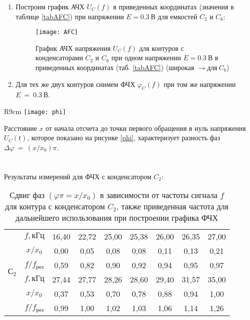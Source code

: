 \documentclass{lab}
\begin{document}
\begin{enumerate}
\newpage

\item
Построим график АЧХ $ U_C(f) $ в приведенных координатах (значения в таблице \ref{tabAFC})
при напряжении $ E = 0.3~В $ для емкостей $ C_2 $ и $ C_6 $:

\begin{figure}[H]
	\centering
	\texttt{[image: AFC]}
	\caption{\footnotesize
	График АЧХ напряжения $ U_C(f) $ для контуров с конденсаторами $ C_2 $ и $ C_6 $
	при одном напряжении $ E = 0.3~В $ в приведенных координатах (таб. \ref{tabAFC})
	(широкая $ \longrightarrow для \ C_6 $)
	}
	\label{AFC}
\end{figure}

\item
Для тех же двух контуров снимем ФЧХ $ \varphi_C(f) $ при том же напряжении $ E~=~0.3~В $.

\end{enumerate}

\begin{wrapfigure}[8]{R}{9cm}
	\vspace{-1.2cm}
	\texttt{[image: phi]}
	\caption{\footnotesize Осциллограммы сигналов $ E(t) $ и $ U_C(t) $}
	\label{phi}
\end{wrapfigure}

\vspace{0.4cm}

Расстояние $ x $ от начала отсчета до точки первого обращения в нуль напряжения $ U_C(t) $,
которое показано на рисунке \ref{phi}, характеризует разность фаз
$ \Delta\varphi~=~(x/x_0)\pi $.\\ \\ \\
Результаты измерений для ФЧХ с конденсатором $ C_2 $:

\begin{table}[H]
	\centering
	{
		\begin{tabular}{|c|c|ccccccc|}
			\hline
			\multirow{6}{*}{$С_2$}
			&$ f, кГц $		&	16,40	&	22,72	&	25,00	&	25,38	&	26,00	&	26,35	&	27,00	\\
			&$ x/x_0 $		&	0,00	&	0,05	&	0,08	&	0,08	&	0,11	&	0,13	&	0,21	\\
			&$ f/f_{рез} $	&	0,59	&	0,82	&	0,90	&	0,92	&	0,94	&	0,95	&	0,97	\\ \cline{2-9}
			&$ f, кГц $		&	27,44	&	27,77	&	28,26	&	28,60	&	29,40	&	31,57	&	35,00	\\
			&$ x/x_0 $		&	0,37	&	0,53	&	0,70	&	0,78	&	0,88	&	0,94	&	1,00	\\
			&$ f/f_{рез} $	&	0,99	&	1,00	&	1,02	&	1,03	&	1,06	&	1,14	&	1,26	\\ \hline
		\end{tabular}
	}
	\caption{\footnotesize
	Сдвиг фаз $ \left(\varphi\pi = x/x_0\right) $ в зависимости от частоты сигнала $ f $ для
	контура	с конденсатором $ C_2 $, также приведенная частота для дальнейшего использования при
	построении графика ФЧХ
	}
	\label{tabPFC2}
\end{table}
\end{document}
